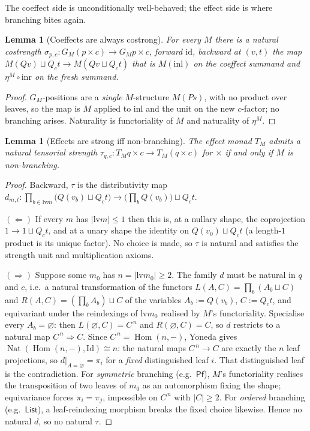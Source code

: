 \documentclass[11pt]{amsart}
\theoremstyle{plain}
\newtheorem{lemma}[theorem]{Lemma}
\theoremstyle{definition}
\theoremstyle{remark}
\newcommand{\id}{\mathrm{id}}
\newcommand{\lv}{\mathrm{lv}}
\newcommand{\Pf}{\mathsf{Pf}}
\newcommand{\List}{\mathsf{List}}
\DeclareMathOperator{\Nat}{Nat}
\DeclareMathOperator{\Hom}{Hom}
\begin{document}
The coeffect side is unconditionally well-behaved; the effect side is where branching bites
again.

\begin{lemma}[Coeffects are always costrong]\label{lem:costrong}
For every $M$ there is a natural costrength $\sigma_{p,c}\colon G_M(p\times c)\to G_M p\times
c$, forward $\id$, backward at $(v,t)$ the map $M(Qv)\sqcup Q_c t\to M(Qv\sqcup Q_c t)$ that is
$M(\mathrm{inl})$ on the coeffect summand and $\eta^M\circ\mathrm{inr}$ on the fresh summand.
\end{lemma}
\begin{proof}
$G_M$-positions are a \emph{single} $M$-structure $M(Ps)$, with no product over leaves, so the
map is $M$ applied to $\mathrm{inl}$ and the unit on the new $c$-factor; no branching arises.
Naturality is functoriality of $M$ and naturality of $\eta^M$.
\end{proof}

\begin{lemma}[Effects are strong iff non-branching]\label{lem:strong}
The effect monad $T_M$ admits a \emph{natural} tensorial strength $\tau_{q,c}\colon T_M
q\times c\to T_M(q\times c)$ for $\times$ if and only if $M$ is non-branching.
\end{lemma}
\begin{proof}
Backward, $\tau$ is the distributivity map
$d_{m,t}\colon\prod_{b\in\lv m}\bigl(Q(v_b)\sqcup Q_c t\bigr)\to\bigl(\prod_b Q(v_b)\bigr)
\sqcup Q_c t$.

$(\Leftarrow)$ If every $m$ has $|\lv m|\le 1$ then this is, at a nullary shape, the coprojection
$1\to 1\sqcup Q_c t$, and at a unary shape the identity on $Q(v_0)\sqcup Q_c t$ (a length-$1$
product is its unique factor). No choice is made, so $\tau$ is natural and satisfies the
strength unit and multiplication axioms.

$(\Rightarrow)$ Suppose some $m_0$ has $n=|\lv m_0|\ge 2$. The family $d$ must be natural in
$q$ and $c$, i.e.\ a natural transformation of the functors $L(A,C)=\prod_b(A_b\sqcup C)$ and
$R(A,C)=(\prod_b A_b)\sqcup C$ of the variables $A_b:=Q(v_b)$, $C:=Q_c t$, and equivariant
under the reindexings of $\lv m_0$ realised by $M$'s functoriality. Specialise every
$A_b=\varnothing$: then $L(\varnothing,C)=C^{\,n}$ and $R(\varnothing,C)=C$, so $d$ restricts
to a natural map $C^{\,n}\Rightarrow C$. Since $C^{\,n}=\Hom(n,-)$, Yoneda gives
$\Nat(\Hom(n,-),\mathrm{Id})\cong n$: the natural maps $C^{\,n}\to C$ are exactly the $n$ leaf
projections, so $d|_{A=\varnothing}=\pi_i$ for a \emph{fixed} distinguished leaf $i$. That
distinguished leaf is the contradiction. For \emph{symmetric} branching (e.g.\ $\Pf$),
$M$'s functoriality realises the transposition of two leaves of $m_0$ as an automorphism
fixing the shape; equivariance forces $\pi_i=\pi_j$, impossible on $C^{\,n}$ with $|C|\ge2$.
For \emph{ordered} branching (e.g.\ $\List$), a leaf-reindexing morphism breaks the fixed
choice likewise. Hence no natural $d$, so no natural $\tau$.
\end{proof}
\end{document}
